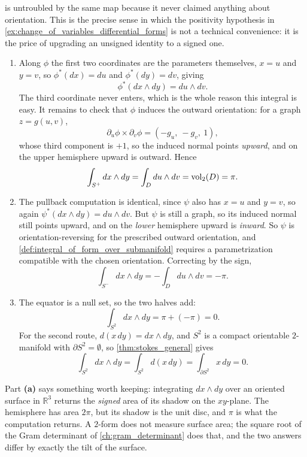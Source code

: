 \begin{exercisesolution}
\begin{enumerate}[label=\textbf{(\alph*)}]
     is untroubled by the same map because it never claimed
    anything about orientation. This is the precise sense in which the positivity hypothesis in
    \cref{ex:change_of_variables_differential_forms} is not a technical convenience: it is the price of upgrading an unsigned
    identity to a signed one.
\end{enumerate}
\end{exercisesolution}

\begin{exercisesolution}
\label{sol:ai_area_form_over_hemisphere}
\begin{enumerate}[label=\textbf{(\alph*)}]
  \item Along $\phi$ the first two coordinates are the parameters themselves, $x = u$ and
    $y = v$, so $\phi^*(dx) = du$ and $\phi^*(dy) = dv$, giving
    \[\phi^*(dx\wedge dy) = du\wedge dv.\]
    The third coordinate never enters, which is the whole reason this integral is easy. It
    remains to check that $\phi$ induces the outward orientation: for a graph $z = g(u,v)$,
    \[\partial_u\phi\times\partial_v\phi = (-g_u,\ -g_v,\ 1),\]
    whose third component is $+1$, so the induced normal points \emph{upward}, and on the upper
    hemisphere upward is outward. Hence
    \[\int_{S^+} dx\wedge dy = \int_D du\wedge dv = \operatorname{vol}_2(D) = \pi.\]
  \item The pullback computation is identical, since $\psi$ also has $x = u$ and $y = v$,
    so again $\psi^*(dx\wedge dy) = du\wedge dv$. But $\psi$ is still a graph, so its induced
    normal still points upward, and on the \emph{lower} hemisphere upward is \emph{inward}. So
    $\psi$ is orientation-reversing for the prescribed outward orientation, and
    \cref{def:integral_of_form_over_submanifold} requires a parametrization compatible with the
    chosen orientation. Correcting by the sign,
    \[\int_{S^-} dx\wedge dy = -\int_D du\wedge dv = -\pi.\]
  \item The equator is a null set, so the two halves add:
    \[\int_{S^2} dx\wedge dy = \pi + (-\pi) = 0.\]
    For the second route, $d(x\,dy) = dx\wedge dy$, and $S^2$ is a compact orientable $2$-manifold
    with $\partial S^2 = \emptyset$, so \cref{thm:stokes_general} gives
    \[\int_{S^2} dx\wedge dy = \int_{S^2} d(x\,dy) = \int_{\partial S^2} x\,dy = 0.\]
\end{enumerate}

\begin{remark}
\label{rem:area_form_measures_the_shadow}
Part \textbf{(a)} says something worth keeping: integrating $dx\wedge dy$ over an oriented
surface in $\mathbb{R}^3$ returns the \emph{signed} area of its shadow on the $xy$-plane. The
hemisphere has area $2\pi$, but its shadow is the unit disc, and $\pi$ is what the computation
returns. A $2$-form does not measure surface area; the square root of the Gram determinant of
\cref{ch:gram_determinant} does that, and the two answers differ by exactly the tilt of the
surface.


\end{remark}
\end{exercisesolution}
